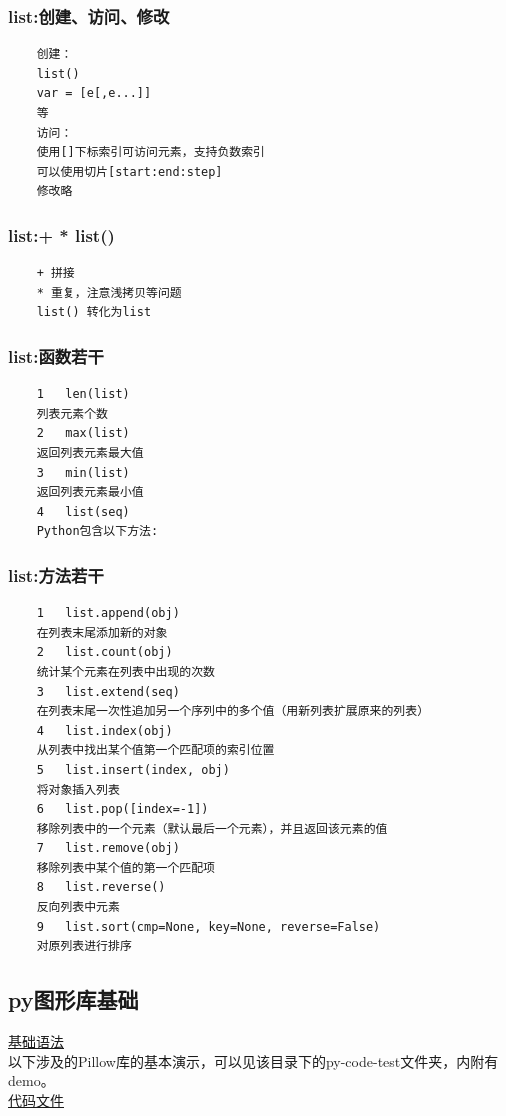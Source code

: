 \documentclass[UTF8]{ctexart}
\begin{document}
\subsubsection{list:创建、访问、修改}
\begin{verbatim}
	创建：
	list()
	var = [e[,e...]]
	等
	访问：
	使用[]下标索引可访问元素，支持负数索引
	可以使用切片[start:end:step]
	修改略
\end{verbatim}

\subsubsection{list:+ * list()}
\begin{verbatim}
	+ 拼接
	* 重复，注意浅拷贝等问题
	list() 转化为list
\end{verbatim}

\subsubsection{list:函数若干}
\begin{verbatim}
	1	len(list)
	列表元素个数
	2	max(list)
	返回列表元素最大值
	3	min(list)
	返回列表元素最小值
	4	list(seq)
	Python包含以下方法:
\end{verbatim}

\subsubsection{list:方法若干}
\begin{verbatim}
	1	list.append(obj)
	在列表末尾添加新的对象
	2	list.count(obj)
	统计某个元素在列表中出现的次数
	3	list.extend(seq)
	在列表末尾一次性追加另一个序列中的多个值（用新列表扩展原来的列表）
	4	list.index(obj)
	从列表中找出某个值第一个匹配项的索引位置
	5	list.insert(index, obj)
	将对象插入列表
	6	list.pop([index=-1])
	移除列表中的一个元素（默认最后一个元素），并且返回该元素的值
	7	list.remove(obj)
	移除列表中某个值的第一个匹配项
	8	list.reverse()
	反向列表中元素
	9	list.sort(cmp=None, key=None, reverse=False)
	对原列表进行排序
\end{verbatim}


\subsection{py图形库基础}
\href{file:py-graphy.txt}{基础语法}
\\
\indent 以下涉及的Pillow库的基本演示，可以见该目录下的py-code-test文件夹，内附有demo。
\\
\indent	\href{file:py-code-test/main.py}{代码文件}
\end{document}
